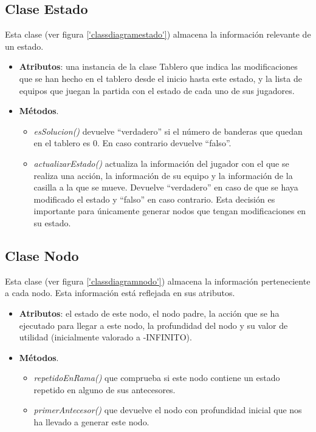 \subsection {Clase Estado}
Esta clase (ver figura \ref{'classdiagramestado'}) almacena la
información relevante de un estado.
\begin{itemize}
\item \textbf{Atributos}: una instancia de la clase Tablero que indica
  las modificaciones que se han hecho en el tablero desde el inicio
  hasta este estado, y la lista de equipos que juegan la partida con
  el estado de cada uno de sus jugadores.
\item \textbf{Métodos}.
  \begin{itemize}
  \item \emph{esSolucion()} devuelve ``verdadero'' si el número de
    banderas que quedan en el tablero es 0. En caso contrario devuelve
    ``falso''.
  \item \emph{actualizarEstado()} actualiza la información del jugador con
    el que se realiza una acción, la información de su equipo y la
    información de la casilla a la que se mueve. Devuelve
    ``verdadero'' en caso de que se haya modificado el estado y
    ``falso'' en caso contrario. Esta decisión es importante para
    únicamente generar nodos que tengan modificaciones en su estado.
  \end{itemize}

\end{itemize}


\subsection {Clase Nodo}
Esta clase (ver figura \ref{'classdiagramnodo'}) almacena la
información perteneciente a cada nodo. Esta información está reflejada
en sus atributos.
\begin{itemize}
\item \textbf{Atributos}: el estado de este nodo, el nodo padre, la
  acción que se ha ejecutado para llegar a este nodo, la profundidad
  del nodo y su valor de utilidad (inicialmente valorado a -INFINITO).
\item \textbf{Métodos}.
  \begin{itemize}
  \item \emph{repetidoEnRama()} que comprueba si este nodo contiene un
    estado repetido en alguno de sus antecesores.
  \item \emph{primerAntecesor()} que devuelve el nodo con profundidad
    inicial que nos ha llevado a generar este nodo.
  \end{itemize}
\end{itemize}

